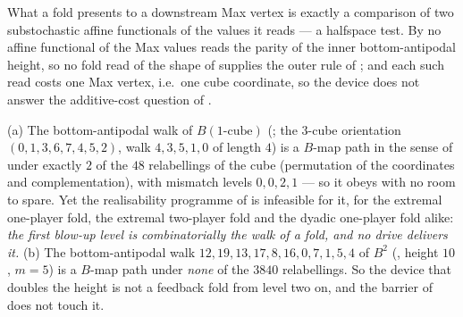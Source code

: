 \begin{corollary}\label{cor:ff-parity}
What a fold presents to a downstream Max vertex is exactly a comparison of two
substochastic affine functionals of the values it reads --- a halfspace test.
By  no affine functional of the Max values reads the
parity of the inner bottom-antipodal height, so no fold read of the shape of
 supplies the outer rule of ; and each such
read costs one Max vertex, i.e.\ one cube coordinate, so the device does not
answer the additive-cost question of .
\end{corollary}

\begin{proposition}\label{prop:ff-blowup}
(a) The bottom-antipodal walk of $B(1\text{-cube})$ (; the
$3$-cube orientation $(0,1,3,6,7,4,5,2)$, walk $4,3,5,1,0$ of length $4$) is a
$B$-map path in the sense of  under exactly $2$ of the $48$
relabellings of the cube (permutation of the coordinates and complementation),
with mismatch levels $0,0,2,1$ --- so it obeys  with no room
to spare. Yet the realisability programme of  is infeasible
for it, for the extremal one-player fold, the extremal two-player fold and the
dyadic one-player fold alike: \emph{the first blow-up level is combinatorially
the walk of a fold, and no drive delivers it.} (b) The bottom-antipodal walk
$12,19,13,17,8,16,0,7,1,5,4$ of $B^{2}$ (, height $10$,
$m=5$) is a $B$-map path under \emph{none} of the $3840$ relabellings. So the
device that doubles the height is not a feedback fold from level two on, and the
barrier of  does not touch it.
\end{proposition}
